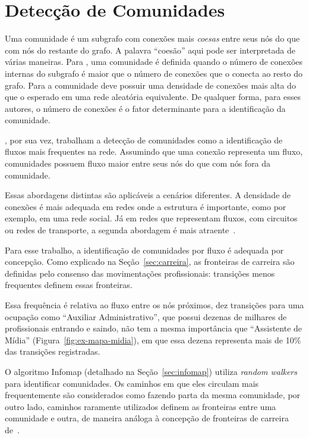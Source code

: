\documentclass[
  article,
  11pt,
  a4paper,
  english,
  brazil,
  sumario=tradicional]{abntex2}
\begin{document}
\section{Detecção de Comunidades}

Uma comunidade é um subgrafo com conexões mais \textit{coesas} entre seus nós do que com nós do restante do grafo. A palavra \enquote{coesão} aqui pode ser interpretada de várias maneiras. Para , uma comunidade é definida quando o número de conexões internas do subgrafo é maior que o número de conexões que o conecta ao resto do grafo. Para  a comunidade deve possuir uma densidade de conexões mais alta do que o esperado em uma rede aleatória equivalente. De qualquer forma, para esses autores, o número de conexões é o fator determinante para a identificação da comunidade.

, por sua vez, trabalham a detecção de comunidades como a identificação de fluxos mais frequentes na rede. Assumindo que uma conexão representa um fluxo, comunidades possuem fluxo maior entre seus nós do que com nós fora da comunidade.

Essas abordagens distintas são aplicáveis a cenários diferentes. A densidade de conexões é mais adequada em redes onde a estrutura é importante, como por exemplo, em uma rede social. Já em redes que representam fluxos, com circuitos ou redes de transporte, a segunda abordagem é mais atraente~\cite{Rosvall2009-sd}.

Para esse trabalho, a identificação de comunidades por fluxo é adequada por concepção. Como explicado na Seção~\ref{sec:carreira}, as fronteiras de carreira são definidas pelo consenso das movimentações profissionais: transições menos frequentes definem essas fronteiras.

Essa frequência é relativa ao fluxo entre os nós próximos, dez transições para uma ocupação como \enquote{Auxiliar Administrativo}, que possui dezenas de milhares de profissionais entrando e saindo, não tem a mesma importância que \enquote{Assistente de Mídia} (Figura~\ref{fig:ex-mapa-midia}), em que essa dezena representa mais de 10\% das transições registradas.

O algoritmo Infomap (detalhado na Seção~\ref{sec:infomap}) utiliza \textit{random walkers} para identificar comunidades. Os caminhos em que eles circulam mais frequentemente são considerados como fazendo parta da mesma comunidade, por outro lado, caminhos raramente utilizados definem as fronteiras entre uma comunidade e outra, de maneira análoga à concepção de fronteiras de carreira de~.
\end{document}

